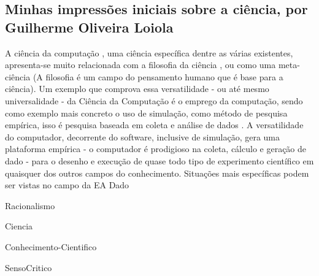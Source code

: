 \subsection{Minhas impressões iniciais sobre a ciência, por Guilherme Oliveira Loiola}

A ciência da computação \citep{baldwin_three-fold_1994}, uma ciência específica dentre as várias existentes, apresenta-se muito relacionada com a filosofia da ciência \citep{floridi_blackwell_2004}, ou como uma meta-ciência (A filosofia é um campo do pensamento humano que é base para a ciência). Um exemplo que comprova essa versatilidade - ou até mesmo universalidade - da Ciência da Computação é o emprego da computação, sendo como exemplo mais concreto o uso de simulação, como método de pesquisa empírica, isso é pesquisa baseada em coleta e análise de dados \citep{tedre_experiments_2014}. A versatilidade do computador, decorrente do software, inclusive de simulação, gera uma plataforma empírica - o computador é prodigioso na coleta, cálculo e geração de dado - para o desenho e execução de quase todo tipo de experimento científico em quaisquer dos outros campos do conhecimento. Situações mais específicas podem ser vistas no campo da \gls{EA} \gls{Dado}

\citet{noauthor_reprodutibilidade_2021}
\gls{Racionalismo}

\gls{Ciencia}

\gls{Conhecimento-Cientifico}

\gls{SensoCritico}
